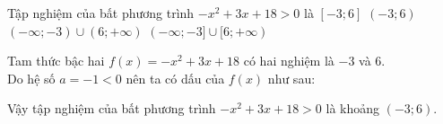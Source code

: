 \begin{ex}%
Tập nghiệm của bất phương trình $-x^2+3x+18>0$ là
\choice
{$[-3;6]$}
{\True $(-3;6)$}
{$(-\infty;-3)\cup (6;+\infty)$}
{$(-\infty;-3]\cup [6;+\infty)$}
\loigiai
{Tam thức bậc hai $f(x)=-x^2+3x+18$ có hai nghiệm là $-3$ và $6$.\\
Do hệ số $a=-1<0$ nên ta có dấu của $f(x)$ như sau:
\begin{center}
\end{center}
Vậy tập nghiệm của bất phương trình $-x^2+3x+18>0$ là khoảng $(-3;6)$.}
\end{ex}

